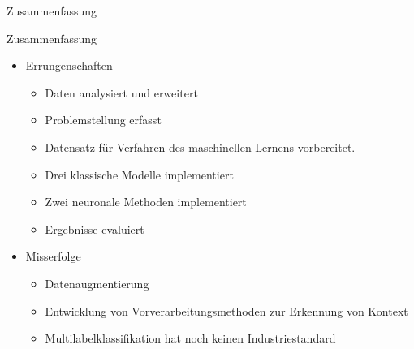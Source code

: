 \documentclass[aspectratio=169]{beamer} %
\begin{document}
\begin{frame}{Zusammenfassung}
    \begin{block}{Zusammenfassung}
        \begin{itemize}
            \item Errungenschaften
                  \begin{itemize}
                      \item Daten analysiert und erweitert
                      \item Problemstellung erfasst
                      \item Datensatz für Verfahren des maschinellen Lernens vorbereitet.
                      \item Drei klassische Modelle implementiert
                      \item Zwei neuronale Methoden implementiert
                      \item Ergebnisse evaluiert
                  \end{itemize}
            \item Misserfolge
                  \begin{itemize}
                      \item Datenaugmentierung
                      \item Entwicklung von Vorverarbeitungsmethoden zur Erkennung von Kontext
                      \item Multilabelklassifikation hat noch keinen Industriestandard
                  \end{itemize}
        \end{itemize}
    \end{block}
\end{frame}
\end{document}
